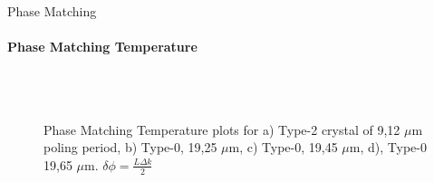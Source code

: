 \documentclass[serif,8pt]{beamer}
\begin{document}
\begin{frame}{Phase Matching}
	\framesubtitle{Phase Matching Temperature}
	\begin{figure}[!ht]
	  \centering
	  \caption{Phase Matching Temperature plots for a) Type-2 crystal of 9,12 $\mu$m poling period, b) Type-0, 19,25 $\mu$m, c) Type-0, 19,45 $\mu$m, d), Type-0 19,65 $\mu$m. $\delta \phi = \frac{L \Delta k}{2}$}
	  \quad
	  \\
	  \quad
	  \\
	  \label{fig:gratingstheory}
	\end{figure}
\end{frame}
\end{document}

